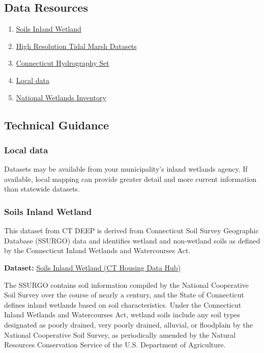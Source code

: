 \documentclass[
  letterpaper,
  DIV=11,
  numbers=noendperiod]{scrreprt}
\providecommand{\tightlist}{%
  \setlength{\itemsep}{0pt}\setlength{\parskip}{0pt}}
\begin{document}
\subsection{Data Resources}\label{data-resources-2}

\begin{enumerate}
\def\labelenumi{\arabic{enumi}.}
\tightlist
\item
  \hyperref[sec-soils-inland-wetland]{Soils Inland Wetland}
\item
  \hyperref[sec-high-resolution-tidal-marsh-datasets]{High Resolution
  Tidal Marsh Datasets}
\item
  \hyperref[sec-connecticut-hydrography-set]{Connecticut Hydrography
  Set}
\item
  \hyperref[sec-local-data3]{Local data}
\item
  \hyperref[sec-nwi]{National Wetlands Inventory}
\end{enumerate}

\subsection{Technical Guidance}\label{technical-guidance-2}

\subsubsection{Local data}\label{sec-local-data3}

Datasets may be available from your municipality's inland wetlands
agency. If available, local mapping can provide greater detail and more
current information than statewide datasets.

\subsubsection{Soils Inland Wetland}\label{sec-soils-inland-wetland}

This dataset from CT DEEP is derived from Connecticut Soil Survey
Geographic Database (SSURGO) data and identifies wetland and non‑wetland
soils as defined by the Connecticut Inland Wetlands and Watercourses
Act.

\textbf{Dataset:}
\href{https://housingmaps.ct.gov/datasets/CTDEEP::soils-inland-wetland/about}{Soils
Inland Wetland (CT Housing Data Hub)}

The SSURGO contains soil information compiled by the National
Cooperative Soil Survey over the course of nearly a century, and the
State of Connecticut defines inland wetlands based on soil
characteristics. Under the Connecticut Inland Wetlands and Watercourses
Act, wetland soils include any soil types designated as poorly drained,
very poorly drained, alluvial, or floodplain by the National Cooperative
Soil Survey, as periodically amended by the Natural Resources
Conservation Service of the U.S. Department of Agriculture.
\end{document}
